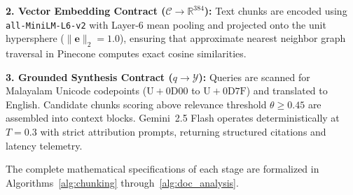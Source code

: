 \documentclass[12pt,a4paper]{report}
\begin{document}
\noindent\textbf{2. Vector Embedding Contract ($\mathcal{C} \to \mathbb{R}^{384}$):} Text chunks are encoded using \texttt{all-MiniLM-L6-v2} with Layer-6 mean pooling and projected onto the unit hypersphere ($\|\mathbf{e}\|_2 = 1.0$), ensuring that approximate nearest neighbor graph traversal in Pinecone computes exact cosine similarities.

\noindent\textbf{3. Grounded Synthesis Contract ($q \to \mathcal{Y}$):} Queries are scanned for Malayalam Unicode codepoints ($\mathrm{U{+}0D00}$ to $\mathrm{U{+}0D7F}$) and translated to English. Candidate chunks scoring above relevance threshold $\theta \ge 0.45$ are assembled into context blocks. Gemini~2.5 Flash operates deterministically at $T=0.3$ with strict attribution prompts, returning structured citations and latency telemetry.

The complete mathematical specifications of each stage are formalized in Algorithms~\ref{alg:chunking} through~\ref{alg:doc_analysis}.
\end{document}
